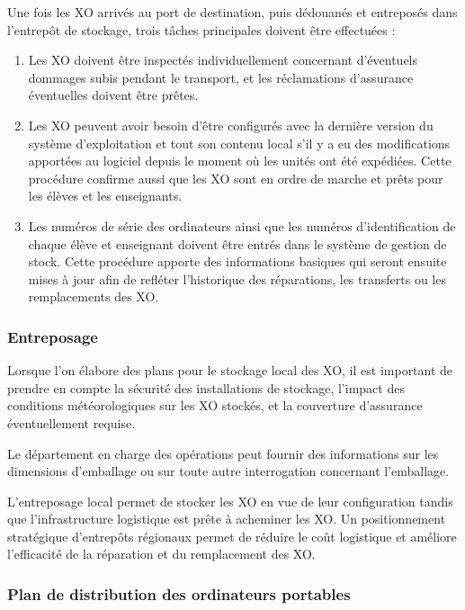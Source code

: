 \documentclass[11pt]{article}
\begin{document}
Une fois les XO arrivés au port de destination, puis dédouanés et
entreposés dans l’entrepôt de stockage, trois tâches principales doivent
être effectuées :

\begin{enumerate}
\item Les XO doivent être inspectés individuellement concernant d'éventuels
   dommages subis pendant le transport, et les réclamations d'assurance
   éventuelles doivent être prêtes.
\item Les XO peuvent avoir besoin d’être configurés avec la dernière version
   du système d'exploitation et tout son contenu local s'il y a eu des
   modifications apportées au logiciel depuis le moment où les unités ont
   été expédiées. Cette procédure confirme aussi que les XO sont en ordre
   de marche et prêts pour les élèves et les enseignants.
\item Les numéros de série des ordinateurs ainsi que les numéros
   d'identification de chaque élève et enseignant doivent être entrés dans
   le système de gestion de stock. Cette procédure apporte des informations
   basiques qui seront ensuite mises à jour afin de refléter l'historique
   des réparations, les transferts ou les remplacements des XO.
\end{enumerate}
\subsubsection{Entreposage}
\label{sec-9-1-1}



Lorsque l'on élabore des plans pour le stockage local des XO, il est
important de prendre en compte la sécurité des installations de stockage,
l'impact des conditions météorologiques sur les XO stockés, et la
couverture d'assurance éventuellement requise.

Le département en charge des opérations peut fournir des informations sur
les dimensions d'emballage ou sur toute autre interrogation concernant
l’emballage.

L’entreposage local permet de stocker les XO en vue de leur configuration
tandis que l’infrastructure logistique est prête à acheminer les XO. Un
positionnement stratégique d’entrepôts régionaux permet de réduire le coût
logistique et améliore l'efficacité de la réparation et du remplacement des
XO.
\subsubsection{Plan de distribution des ordinateurs portables}
\label{sec-9-1-2}
\end{document}
